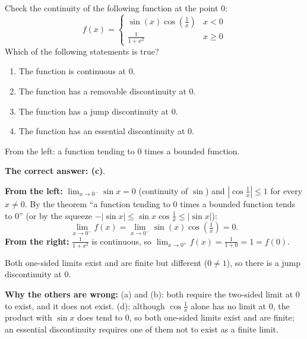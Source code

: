 
\begin{question}
Check the continuity of the following function at the point 0:
\[
f(x)=\begin{cases}
\sin(x)\cos(\frac{1}{x}) & x<0\\
\frac{1}{1+x^2} & x\ge 0
\end{cases}
\]
Which of the following statements is true?
\begin{enumerate}
  \item The function is continuous at 0.
  \item The function has a removable discontinuity at 0.
  \item The function has a jump discontinuity at 0.
  \item The function has an essential discontinuity at 0.
\end{enumerate}
\end{question}

\begin{hint}
From the left: a function tending to 0 times a bounded function.
\end{hint}

\begin{solution}
\textbf{The correct answer: (c)}.

\textbf{From the left:} $\lim_{x\to0^-}\sin x=0$ (continuity of $\sin$) and $\left|\cos\frac1x\right|\le1$ for every $x\neq0$. By the theorem ``a function tending to 0 times a bounded function tends to 0'' (or by the squeeze $-|\sin x|\le\sin x\cos\frac1x\le|\sin x|$):
\[
\lim_{x\to0^-}f(x)=\lim_{x\to0^-}\sin(x)\cos\left(\tfrac1x\right)=0 .
\]
\textbf{From the right:} $\frac{1}{1+x^2}$ is continuous, so $\lim_{x\to0^+}f(x)=\frac{1}{1+0}=1=f(0)$.

Both one-sided limits exist and are finite but different ($0\neq1$), so there is a jump discontinuity at 0.

\textbf{Why the others are wrong:} (a) and (b): both require the two-sided limit at 0 to exist, and it does not exist. (d): although $\cos\frac1x$ alone has no limit at 0, the product with $\sin x$ does tend to 0, so both one-sided limits exist and are finite; an essential discontinuity requires one of them not to exist as a finite limit.
\end{solution}
